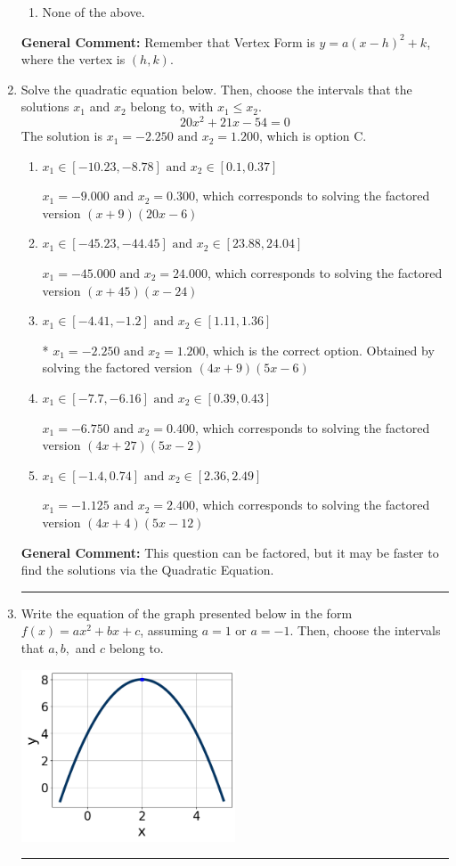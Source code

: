 \documentclass{extbook}[14pt]
\newcommand{\litem}[1]{\item #1

\rule{\textwidth}{0.4pt}}
\begin{document}
\begin{enumerate}
{\begin{enumerate}[label=\Alph*.]
\begin{multicols}{2}
\end{multicols}\item None of the above.\end{enumerate}
\textbf{General Comment:} Remember that Vertex Form is $y = a(x-h)^2+k$, where the vertex is $(h, k)$.
}
\litem{
Solve the quadratic equation below. Then, choose the intervals that the solutions $x_1$ and $x_2$ belong to, with $x_1 \leq x_2$.
\[ 20x^{2} +21 x -54 = 0 \]The solution is \( x_1 = -2.250 \text{ and } x_2 = 1.200 \), which is option C.\begin{enumerate}[label=\Alph*.]
\item \( x_1 \in [-10.23, -8.78] \text{ and } x_2 \in [0.1, 0.37] \)

$x_1 = -9.000 \text{ and } x_2 = 0.300$, which corresponds to solving the factored version $(x + 9)(20x -6)$
\item \( x_1 \in [-45.23, -44.45] \text{ and } x_2 \in [23.88, 24.04] \)

$x_1 = -45.000 \text{ and } x_2 = 24.000$, which corresponds to solving the factored version $(x + 45)(x -24)$
\item \( x_1 \in [-4.41, -1.2] \text{ and } x_2 \in [1.11, 1.36] \)

* $x_1 = -2.250 \text{ and } x_2 = 1.200$, which is the correct option. Obtained by solving the factored version $(4x + 9)(5x -6)$
\item \( x_1 \in [-7.7, -6.16] \text{ and } x_2 \in [0.39, 0.43] \)

$x_1 = -6.750 \text{ and } x_2 = 0.400$, which corresponds to solving the factored version $(4x + 27)(5x -2)$
\item \( x_1 \in [-1.4, 0.74] \text{ and } x_2 \in [2.36, 2.49] \)

$x_1 = -1.125 \text{ and } x_2 = 2.400$, which corresponds to solving the factored version $(4x + 4)(5x -12)$
\end{enumerate}

\textbf{General Comment:} This question can be factored, but it may be faster to find the solutions via the Quadratic Equation.
}
\litem{
Write the equation of the graph presented below in the form $f(x)=ax^2+bx+c$, assuming  $a=1$ or $a=-1$. Then, choose the intervals that $a, b,$ and $c$ belong to.

\begin{center}
    \includegraphics[width=0.5\textwidth]{../Figures/quadraticGraphToEquationCopyA.png}
\end{center}


}
\end{enumerate}
\end{document}
